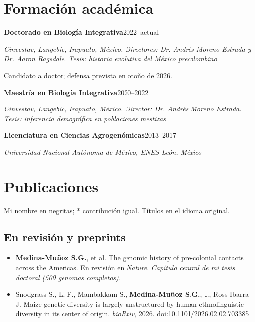 \documentclass[11pt,letterpaper]{article}
\newcommand{\yo}{\textbf{Medina-Muñoz S.G.}}
\newcommand{\entrada}[3]{\textbf{#1}\hfill{\small #3}\par{\itshape #2}\par}
\newcommand{\pub}[1]{\item #1}
\begin{document}
\section*{Formación académica}
\entrada{Doctorado en Biología Integrativa}{Cinvestav, Langebio, Irapuato, México. Directores: Dr. Andrés Moreno Estrada y Dr. Aaron Ragsdale. Tesis: historia evolutiva del México precolombino}{2022--actual}
{\small Candidato a doctor; defensa prevista en otoño de 2026.}\par\smallskip
\entrada{Maestría en Biología Integrativa}{Cinvestav, Langebio, Irapuato, México. Director: Dr. Andrés Moreno Estrada. Tesis: inferencia demográfica en poblaciones mestizas}{2020--2022}
\smallskip
\entrada{Licenciatura en Ciencias Agrogenómicas}{Universidad Nacional Autónoma de México, ENES León, México}{2013--2017}

\section*{Publicaciones}
{\small Mi nombre en negritas; * contribución igual. Títulos en el idioma original.}

\subsection*{En revisión y preprints}
\begin{itemize}
\pub{\yo, et al. The genomic history of pre-colonial contacts across the Americas. En revisión en \textit{Nature}. \emph{Capítulo central de mi tesis doctoral (500 genomas completos).}}
\pub{Snodgrass S., Li F., Mambakkam S., \yo, \ldots, Ross-Ibarra J. Maize genetic diversity is largely unstructured by human ethnolinguistic diversity in its center of origin. \textit{bioRxiv}, 2026. \href{https://doi.org/10.1101/2026.02.02.703385}{doi:10.1101/2026.02.02.703385}}
\end{itemize}
\end{document}
